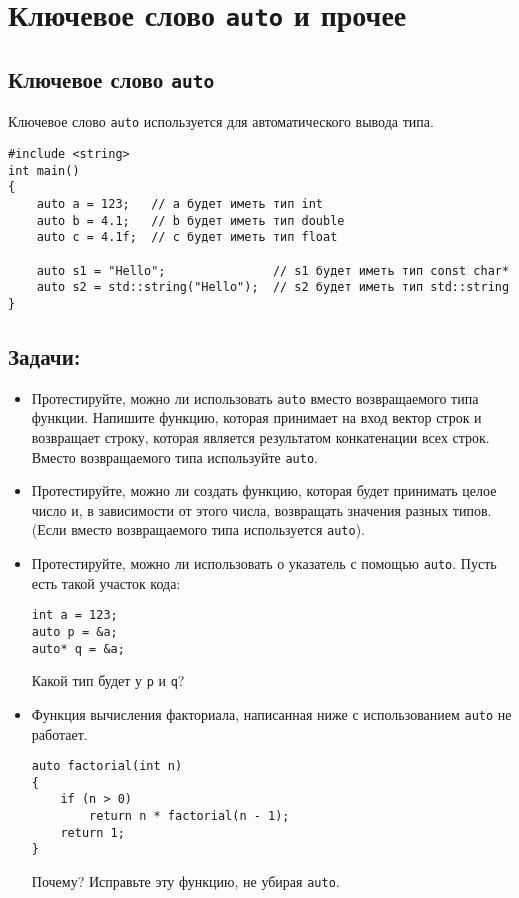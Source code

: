 \documentclass{article}
\begin{document}
\newpage
\section*{Ключевое слово \texttt{auto} и прочее}

\subsection*{Ключевое слово \texttt{auto}}
Ключевое слово \texttt{auto} используется для автоматического вывода типа.
\begin{lstlisting}
#include <string>
int main() 
{
    auto a = 123;   // a будет иметь тип int
    auto b = 4.1;   // b будет иметь тип double
    auto c = 4.1f;  // c будет иметь тип float
    
    auto s1 = "Hello";               // s1 будет иметь тип const char*
    auto s2 = std::string("Hello");  // s2 будет иметь тип std::string
}

\end{lstlisting}


\subsection*{Задачи:}
\begin{itemize}
\item Протестируйте, можно ли использовать \texttt{auto} вместо возвращаемого типа функции. Напишите функцию, которая принимает на вход вектор строк и возвращает строку, которая является результатом конкатенации всех строк. Вместо возвращаемого типа используйте \texttt{auto}.
\item Протестируйте, можно ли создать функцию, которая будет принимать целое число и, в зависимости от этого числа, возвращать значения разных типов. (Если вместо возвращаемого типа используется \texttt{auto}).

\item Протестируйте, можно ли использовать о указатель с помощью \texttt{auto}. Пусть есть такой участок кода:
\begin{lstlisting}
int a = 123;
auto p = &a;
auto* q = &a;
\end{lstlisting}
Какой тип будет у \texttt{p} и \texttt{q}?
\item Функция вычисления факториала, написанная ниже с использованием \texttt{auto} не работает. 
\begin{lstlisting}
auto factorial(int n) 
{
    if (n > 0)
        return n * factorial(n - 1);
    return 1;
}
\end{lstlisting}
Почему? Исправьте эту функцию, не убирая \texttt{auto}.
\end{itemize}
\end{document}
